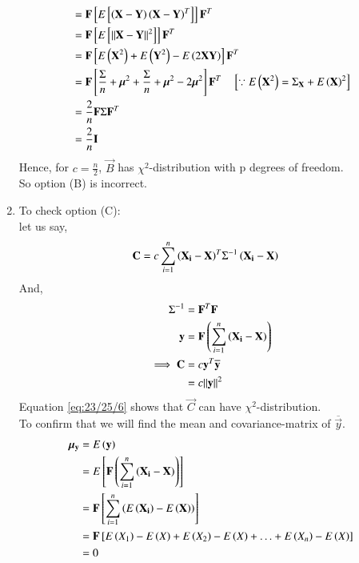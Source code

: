 \documentclass[journal,12pt,onecolumn]{IEEEtran}
\theoremstyle{remark}
\begin{document}
\begin{enumerate}[label=(\alph*)]
\begin{align}
                   &= \mathbf{F}{}\left[E{}\left[\left(\mathbf{X}-\mathbf{Y}\right){\left(\mathbf{X}-\mathbf{Y}\right)}^T\right]\right]{\mathbf{F}}^T \\
                   &= \mathbf{F}{}\left[E{}\left[{\left\lVert\mathbf{X}-\mathbf{Y}\right\rVert}^2\right]\right]{\mathbf{F}}^T \\
                   &= \mathbf{F}{}\left[E\left({\mathbf{X}}^2\right)+E\left({\mathbf{Y}}^2\right)-E\left(2\mathbf{X}\mathbf{Y}\right)\right]{\mathbf{F}}^T  \\
                   &= \mathbf{F}{}\left[\frac{\Sigma}{n}+{\bm{\mu}}^2+\frac{\Sigma}{n}+{\bm{\mu}}^2-2{\bm{\mu}}^2\right]{\mathbf{F}}^T  \quad {}\left[\because E\left({\mathbf{X}}^2\right)={\Sigma}_{\mathbf{X}}+{E\left(\mathbf{X}\right)}^2\right]\\
                   &= \frac{2}{n}\mathbf{F}\Sigma{\mathbf{F}}^T \\
                   &= \frac{2}{n}\mathbf{I}                 
\end{align}
Hence, for $c=\frac{n}{2}$, $\vec{B}$ has ${\chi}^2$-distribution with p degrees of freedom. \\
So option (B) is incorrect. 
\item To check option (C): \\
let us say,
\begin{align}
\mathbf{C} &= c\sum_{i=1}^n{\left(\mathbf{X_i}-\mathbf{X}\right)}^T{\Sigma}^{-1}\left(\mathbf{X_i}-\mathbf{X}\right)
\end{align}
And,
\begin{align}
{\Sigma}^{-1} &= {\mathbf{F}}^T\mathbf{F}  \\
\mathbf{y} &= \mathbf{F}\left(\sum_{i=1}^{n}\left(\mathbf{X_i}-\mathbf{X}\right)\right) \\
\implies \mathbf{C} &= c{\mathbf{y}}^T\overline{\mathbf{y}} \\
                 &= c{\left\lVert\mathbf{y}\right\rVert}^2  \label{eq:23/25/6}
\end{align}
Equation \eqref{eq:23/25/6} shows that $\vec{C}$ can have ${\chi}^2$-distribution. \\
To confirm that we will find the mean and covariance-matrix of $\overline{\vec{y}}$.
\begin{align}
{\bm{\mu}}_{\vec{y}} &= E\brak{\vec{y}} \\
                     &= E\sbrak{\vec{F}\brak{\sum_{i=1}^{n}\brak{\vec{X_i}-\vec{X}}}} \\
                     &= \vec{F}\sbrak{\sum_{i=1}^{n}\brak{E\brak{\vec{X_i}}-E\brak{\vec{X}}}} \\
                     &= \vec{F}\sbrak{E\brak{X_1}-E\brak{X}+E\brak{X_2}-E\brak{X}+\ldots+E\brak{X_n}-E\brak{X}}\\
                     &= 0

\end{align}
\end{enumerate}
\end{document}
